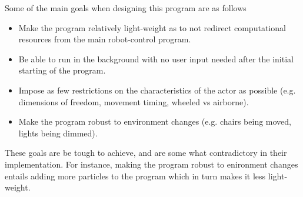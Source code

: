 \documentclass[a4paper,11pt]{article}
\begin{document}
Some of the main goals when designing this program are as follows 
 \begin{itemize}
 \item Make the program relatively light-weight as to not redirect computational resources from the main robot-control program.
 \item Be able to run in the background with no user input needed after the initial starting of the program. 
 \item Impose as few restrictions on the characteristics of the actor as possible (e.g. dimensions of freedom, movement timing, wheeled vs airborne).
 \item Make the program robust to environment changes (e.g. chairs being moved, lights being dimmed).
 \end{itemize}
  These goals are be tough to achieve, and are some what contradictory in their implementation. For instance, making the program robust to enironment changes entails adding more particles to the program which in turn makes it less light-weight. 

 

   
\end{document}
